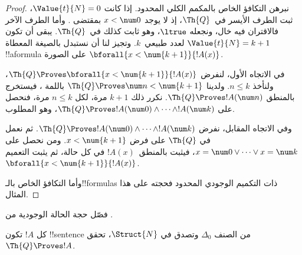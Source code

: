 \documentclass[../../../include/open-logic-section]{subfiles}
\begin{document}
\begin{proof}
نبرهن التكافؤ الخاص بالمكمم الكلي المحدود.
إذا كانت $\Value{t}{N}=0$، ثبت الطرف الأيسر في~$\Th{Q}$،
إذ لا يوجد $x<\num 0$ بمقتضى
.
وأما الطرف الآخر فالاقتران فيه خال، ونجعله $\ltrue$،
وهو ثابت كذلك في~$\Th{Q}$.
%
يبقى أن تكون $\Value{t}{N}=k+1$ لعدد طبيعي~$k$.
وتجيز لنا  أن نستبدل بالصيغة المعطاة
!!a{formula} على الصورة $\bforall{x<\num{k+1}}{!A(x)}$.

في الاتجاه الأول، لنفرض
$\Th{Q}\Proves\bforall{x<\num{k+1}}{!A(x)}$،
ولنأخذ $n\leq k$.
ولدينا $\Th{Q}\Proves\num n<\num{k+1}$
باللمة ،
فيستخرج بالمنطق $\Th{Q}\Proves !A(\num n)$.
نكرر ذلك $k+1$ مرة، لكل $n\leq k$ مرة،
فنحصل على $\Th{Q}\Proves !A(\num 0)\land\dots\land !A(\num k)$،
وهو المطلوب.

وفي الاتجاه المقابل، نفرض
$\Th{Q}\Proves !A(\num 0)\land\dots\land !A(\num k)$.
ثم نعمل في $\Th{Q}$ على فرض $x<\num{k+1}$.
ومن  نحصل على
$x=\num 0\lor\dots\lor x=\num k$،
فيثبت بالمنطق~$!A(x)$ في كل حالة، ثم يثبت التعميم
$\bforall{x<\num{k+1}}{!A(x)}$.

وأما التكافؤ الخاص بالـ!!{formula}s ذات التكميم الوجودي المحدود
فحجته على هذا المثال.
\end{proof}

\begin{prob}
فصّل حجة الحالة الوجودية من
.
\end{prob}

\begin{lem}
كل $!A$ تكون !!{sentence} من الصنف $\Delta_0$ وتصدق في
$\Struct{N}$، تحقق $\Th{Q}\Proves !A$.
\end{lem}
\end{document}
